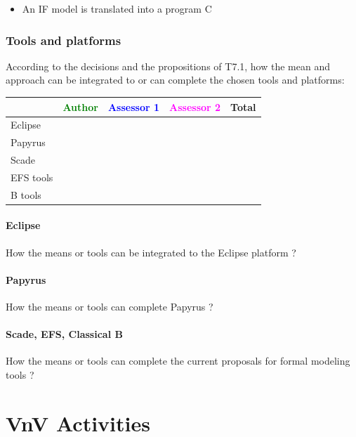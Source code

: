 \begin{author_comment}
	\begin{itemize}
		\item An IF model is translated into a program C
	\end{itemize}
\end{author_comment}

\subsubsection{Tools and platforms}

According to the decisions and the propositions of T7.1, how the mean and approach can be integrated to or can complete the chosen tools and platforms:

\begin{tabular}{|l | c | c | c | c|}
\hline
& \textcolor{green}{Author} & \textcolor{blue}{Assessor 1} & \textcolor{magenta}{Assessor 2} & Total \\
\hline 
Eclipse & & & &  \\
\hline
Papyrus  & & & & \\
\hline
Scade & & & & \\
\hline
EFS tools & & & & \\
\hline
B tools & & & & \\
\hline
\end{tabular}


\paragraph{Eclipse}
How the means or tools can be integrated to the Eclipse platform ?

\paragraph{Papyrus}
How the means or tools can complete  Papyrus ?


\paragraph{Scade, EFS, Classical B}
How the means or tools can complete the current proposals for formal modeling tools ?





\section{VnV Activities}

